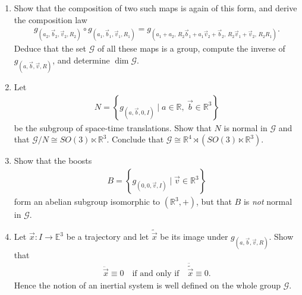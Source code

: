 \documentclass[12pt]{article}
\begin{document}
\begin{enumerate}
\item[(a)]
Show that the composition of two such maps is again of this form, and derive the
composition law
\begin{align*}
g_{(a_2,\vec{b}_2,\vec{v}_2,R_2)}
\circ
g_{(a_1,\vec{b}_1,\vec{v}_1,R_1)}
=
g_{(a_1+a_2,\,
R_2\vec{b}_1+a_1\vec{v}_2+\vec{b}_2,\,
R_2\vec{v}_1+\vec{v}_2,\,
R_2R_1)}.
\end{align*}
Deduce that the set $\mathcal{G}$ of all these maps is a group, compute the inverse of
$g_{(a,\vec{b},\vec{v},R)}$, and determine $\dim \mathcal{G}$.

\item[(b)]
Let
\begin{align*}
N
=
\left\{
g_{(a,\vec{b},0,I)}
\mid
a \in \mathbb{R},\ \vec{b} \in \mathbb{R}^3
\right\}
\end{align*}
be the subgroup of space-time translations. Show that $N$ is normal in
$\mathcal{G}$ and that
$\mathcal{G}/N \cong SO(3)\ltimes\mathbb{R}^3$.
Conclude that
$\mathcal{G}\cong\mathbb{R}^4\rtimes\left(SO(3)\ltimes\mathbb{R}^3\right)$.

\item[(c)]
Show that the boosts
\begin{align*}
B
=
\left\{
g_{(0,0,\vec{v},I)}
\mid
\vec{v} \in \mathbb{R}^3
\right\}
\end{align*}
form an abelian subgroup isomorphic to $(\mathbb{R}^3,+)$, but that $B$ is
\emph{not} normal in $\mathcal{G}$.

\item[(d)]
Let $\vec{x}:I\to\mathbb{E}^3$ be a trajectory and let
$\widetilde{\vec{x}}$ be its image under $g_{(a,\vec{b},\vec{v},R)}$.
Show that
\begin{align*}
\ddot{\vec{x}}\equiv 0
\quad\text{if and only if}\quad
\ddot{\widetilde{\vec{x}}}\equiv 0.
\end{align*}
Hence the notion of an inertial system is well defined on the whole group
$\mathcal{G}$.
\end{enumerate}
\end{document}
